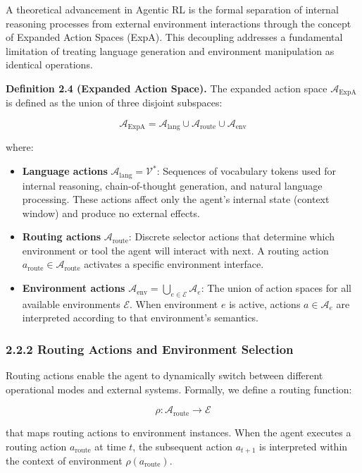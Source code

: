 A theoretical advancement in Agentic RL is the formal separation of internal reasoning processes from external environment interactions through the concept of Expanded Action Spaces (ExpA). This decoupling addresses a fundamental limitation of treating language generation and environment manipulation as identical operations.

\textbf{Definition 2.4 (Expanded Action Space).} The expanded action space $\mathcal{A}_{\text{ExpA}}$ is defined as the union of three disjoint subspaces:

$$\mathcal{A}_{\text{ExpA}} = \mathcal{A}_{\text{lang}} \cup \mathcal{A}_{\text{route}} \cup \mathcal{A}_{\text{env}}$$

where:

\begin{itemize}
    \item \textbf{Language actions} $\mathcal{A}_{\text{lang}} = \mathcal{V}^*$: Sequences of vocabulary tokens used for internal reasoning, chain-of-thought generation, and natural language processing. These actions affect only the agent's internal state (context window) and produce no external effects.

    \item \textbf{Routing actions} $\mathcal{A}_{\text{route}}$: Discrete selector actions that determine which environment or tool the agent will interact with next. A routing action $a_{\text{route}} \in \mathcal{A}_{\text{route}}$ activates a specific environment interface.

    \item \textbf{Environment actions} $\mathcal{A}_{\text{env}} = \bigcup_{e \in \mathcal{E}} \mathcal{A}_e$: The union of action spaces for all available environments $\mathcal{E}$. When environment $e$ is active, actions $a \in \mathcal{A}_e$ are interpreted according to that environment's semantics.

\end{itemize}
\subsubsection{2.2.2 Routing Actions and Environment Selection}

Routing actions enable the agent to dynamically switch between different operational modes and external systems. Formally, we define a routing function:

$$\rho: \mathcal{A}_{\text{route}} \rightarrow \mathcal{E}$$

that maps routing actions to environment instances. When the agent executes a routing action $a_{\text{route}}$ at time $t$, the subsequent action $a_{t+1}$ is interpreted within the context of environment $\rho(a_{\text{route}})$.

